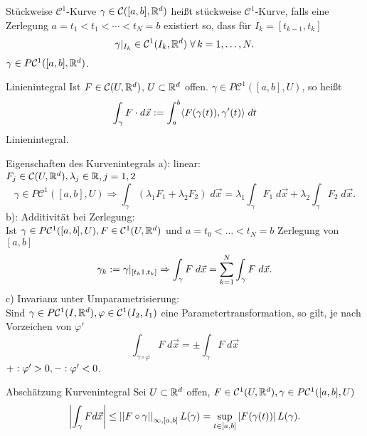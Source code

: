 \documentclass[main.tex]{subfiles}
\begin{document}
\begin{karte}{Stückweise \( \mathcal{C}^1 \)-Kurve}
    \(\gamma \in \mathcal{C}([a,b], \R^d)\) heißt stückweise
    \(\mathcal{C}^1\)-Kurve, falls eine Zerlegung
    \(a = t_1 < t_1 < \cdots < t_N = b\) existiert so, dass
    für \( I_k = [t_{k-1}, t_k]\)
    \[ \gamma \vert_{I_k} \in \mathcal{C}^1(I_k, \R^d) 
    \; \forall k = 1,\ldots,N. \]
    \( \gamma \in P \mathcal{C}^1([a,b], \R^d)\).
\end{karte}

\begin{karte}{Linienintegral}
    Ist \( F \in \mathcal{C}(U, \R^d) \), \(U \subset \R^d\) offen. 
    \( \gamma \in P\mathcal{C}^1([a,b], U) \), so heißt 
    \[ \int_\gamma F\cdot d \vec{x} 
    := \integralx{\scalarprod{ F(\gamma(t)) }{ \gamma'(t) } }{a}{b}{t} \]
    Linienintegral.
\end{karte}

\begin{karte}{Eigenschaften des Kurvenintegrals}
    a): linear: \\
    \( F_j \in \mathcal{C}(U, \R^d), \lambda_j \in \R, j = 1,2 \)
    \[ \gamma \in P\mathcal{C}^1([a,b], U) \Rightarrow 
    \int_\gamma (\lambda_1 F_1 + \lambda_2 F_2)\; d\vec{x} 
    = \lambda_1 \int_\gamma F_1\; d\vec{x} + \lambda_2 \int_\gamma F_2
    \; d\vec{x}. \]
    b): Additivität bei Zerlegung:\\
    Ist \(\gamma \in P\mathcal{C}^1([a,b], U), 
    F \in \mathcal{C}^1(U, \R^d) \)
    und \(a = t_0 < \ldots < t_N = b\) Zerlegung von \([a,b]\)
    \[\gamma_k := \gamma\vert_{[t_k1, t_k]}
    \Rightarrow \integralx{F}{\gamma}{}{\vec{x}}
    = \sum_{k=1}^N\integralx{F}{\gamma}{}{\vec{x}}.\]    
    c) Invarianz unter Umparametrisierung:\\
    Sind \(\gamma \in P\mathcal{C}^1(I,\R^d), \varphi \in 
    \mathcal{C}^1(I_2, I_1)\)
    eine Parametertransformation, so gilt, je nach Vorzeichen 
    von \(\varphi'\)
    \[ \int_{\gamma \circ \varphi} F \; d\vec{x} 
    = \pm \int_\gamma F \; d\vec{x} \]
    \(+: \varphi' > 0, \\
    -: \varphi' < 0\).
\end{karte}

\begin{karte}{Abschätzung Kurvenintegral}
    Sei \(U \subset \R^d\) offen, \(F \in \mathcal{C}^1(U, \R^d), \gamma \in P\mathcal{C}^1([a,b], U)\)
    \[ \abs{\int_\gamma F d\vec{x}} \leq \norm{F \circ \gamma}_{\infty,[a,b]} L(\gamma) 
    = \underset{t \in [a,b]}{\sup} \abs{F(\gamma(t))} L(\gamma).\]
\end{karte}
\end{document}
